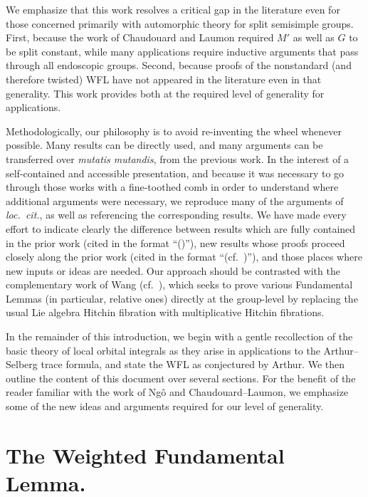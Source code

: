 \documentclass[openany]{amsbook}
\theoremstyle{definition}
\theoremstyle{remark}
\numberwithin{equation}{section}
\renewcommand{\-}{\operatorname{-}}
\begin{document}
We emphasize that this work resolves a critical gap in the literature even for those concerned primarily with automorphic theory for split semisimple groups. First, because the work of Chaudouard and Laumon required $M'$ as well as $G$ to be split constant, while many applications require inductive arguments that pass through all endoscopic groups. Second, because proofs of the nonstandard (and therefore twisted) WFL have not appeared in the literature even in that generality. This work provides both at the required level of generality for applications.


Methodologically, our philosophy is to avoid re-inventing the wheel whenever possible. Many results can be directly used, and many arguments can be transferred over \textit{mutatis mutandis}, from the previous work. In the interest of a self-contained and accessible presentation, and because it was necessary to go through those works with a fine-toothed comb in order to understand where additional arguments were necessary, we reproduce many of the arguments of \textit{loc.\ cit.}, as well as referencing the corresponding results. We have made every effort to indicate clearly the difference between results which are fully contained in the prior work (cited in the format ``(\cite[Corollaire 3.9.2]{CLI})''), new results whose proofs proceed closely along the prior work (cited in the format ``(cf.\ \cite[Corollaire 3.9.2]{CLI})''), and those places where new inputs or ideas are needed. Our approach should be contrasted with the complementary work of Wang (cf.\ \cite{griffinthesis}), which seeks to prove various Fundamental Lemmas (in particular, relative ones) directly at the group-level by replacing the usual Lie algebra Hitchin fibration with multiplicative Hitchin fibrations.

In the remainder of this introduction, we begin with a gentle recollection of the basic theory of local orbital integrals as they arise in applications to the Arthur--Selberg trace formula, and state the WFL as conjectured by Arthur. We then outline the content of this document over several sections. For the benefit of the reader familiar with the work of Ng\^{o} and Chaudouard--Laumon, we emphasize some of the new ideas and arguments required for our level of generality.

\section{The Weighted Fundamental Lemma.}
\end{document}
